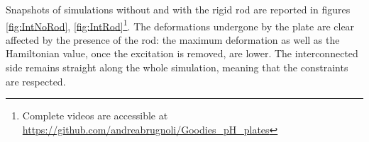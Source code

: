 \documentclass[letterpaper, 10 pt, conference]{ieeeconf}
\begin{document}
Snapshots of simulations without and with the rigid rod are reported in figures \ref{fig:IntNoRod}, \ref{fig:IntRod}\footnote{\label{note:1}Complete videos are accessible at \url{https://github.com/andreabrugnoli/Goodies_pH_plates}}. The deformations undergone by the plate are clear affected by the presence of the rod: the maximum deformation as well as the Hamiltonian value, once the excitation is removed, are lower. The interconnected side remains straight along the whole simulation, meaning that the constraints are respected.

\begin{figure*}[t]
	\centering
	\hfil
	\hfil
	\caption{Snapshots without rod ($t_{\text{end}} = 10 \,[ms]$).}
	\label{fig:IntNoRod}
\end{figure*}

\begin{figure*}[t]
	\centering
	\hfil
	\hfil
	\caption{Snapshots with rod ($t_{\text{end}} = 10 \,[ms]$).}
	\label{fig:IntRod}
\end{figure*}
\end{document}
